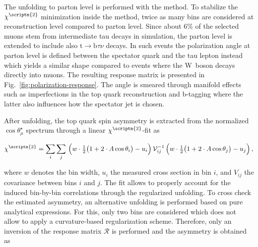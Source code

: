 
The unfolding to parton level is performed with the \TUNFOLD method. To stabilize the $\chi^\scriptn{2}$ minimization inside the method, twice as many bins are considered at reconstruction level compared to parton level. Since about 6\% of the selected muons stem from intermediate tau decays in simulation, the parton level is extended to include also $\mathrm{t}\to\mathrm{b}\tau\nu$ decays. In such events the polarization angle at parton level is defined between the spectator quark and the tau lepton instead which yields a similar shape compared to events where the W~boson decays directly into muons. The resulting response matrix is presented in Fig.~\ref{fig:polarization-response}. The angle is smeared through manifold effects such as imperfections in the top quark reconstruction and b-tagging where the latter also influences how the spectator jet is chosen. 
 

After unfolding, the top quark spin asymmetry is extracted from the normalized $\cos\theta_\mu^\star$ spectrum through a linear $\chi^\scriptn{2}$-fit as

\begin{equation}
\chi^\scriptn{2}=\sum_{i}\sum_{j}\,\Big(w\cdot\tfrac{1}{2}\big(1+2\cdot A \cos\theta_{i}\big)-u_{i}\Big)\,\mathcal{V}_{ij}^{-1}\,\Big(w\cdot\tfrac{1}{2}\big(1+2\cdot A \cos\theta_{j}\big)-u_{j}\Big)\,,
\end{equation}

where $w$ denotes the bin width, $u_{i}$ the measured cross section in bin $i$, and $V_{ij}$ the covariance between bins $i$ and $j$. The fit allows to properly account for the induced bin-by-bin correlations through the regularized unfolding. To cross check the estimated asymmetry, an alternative unfolding is performed based on pure analytical expressions. For this, only two bins are considered which does not allow to apply a curvature-based regularization scheme. Therefore, only an inversion of the response matrix $\mathcal{R}$ is performed and the asymmetry is obtained as

